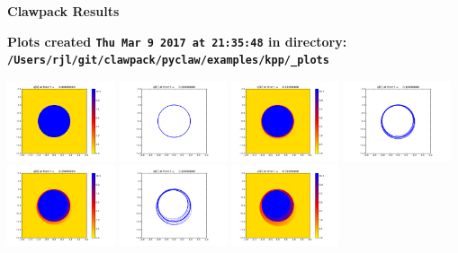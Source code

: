 \documentclass[11pt]{article}
\begin{document}
        \begin{center}{\Large\bf Clawpack Results}\vskip 5pt
        
        \bf Plots created {\tt Thu Mar  9 2017 at 21:35:48} in directory: \vskip 5pt
        \verb+/Users/rjl/git/clawpack/pyclaw/examples/kpp/_plots+
        \end{center}
        \vskip 5pt
        \includegraphics[width=0.2375\textwidth]{frame0000fig0.png}
\includegraphics[width=0.2375\textwidth]{frame0000fig1.png}
\includegraphics[width=0.2375\textwidth]{frame0001fig0.png}
\includegraphics[width=0.2375\textwidth]{frame0001fig1.png}
\vskip 10pt 
\includegraphics[width=0.2375\textwidth]{frame0002fig0.png}
\includegraphics[width=0.2375\textwidth]{frame0002fig1.png}
\includegraphics[width=0.2375\textwidth]{frame0003fig0.png}
\end{document}
